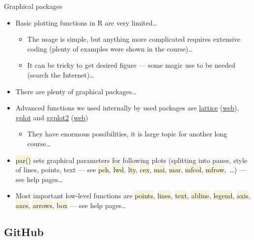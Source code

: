 \documentclass[compress, xelatex, 11pt, xcolor=svgnames, aspectratio=169,
	hyperref={
		bookmarks=true,
		unicode=true,
		colorlinks=true,
		pdftitle={Molecular data in R},
		plainpages=false,
		pdfauthor={Vojtech Zeisek},
		pdfsubject={Course about phylogeny and evolution in R},
		pdfcreator={XeLaTeX},
		pdfkeywords={R, evolution, phylogeny, molecular data},
		linkcolor=Crimson, %
		anchorcolor=Magenta, %
		citecolor=Magenta, %
		filecolor=Magenta, %
		menucolor=Magenta, %
		urlcolor=DodgerBlue, %
		},
	url={hyphens, lowtilde} %
	]{beamer}
\renewcommand{\texttt}[1]{\colorbox{Beige}{{\ttfamily #1}}}
\begin{document}
\begin{frame}{Graphical packages}
	\begin{itemize}
		\item Basic plotting functions in R are very limited\ldots
		\begin{itemize}
			\item The usage is simple, but anything more complicated requires extensive coding (plenty of examples were shown in the course)\ldots
			\item It can be tricky to get desired figure --- some magic use to be needed (search the Internet)\ldots
		\end{itemize}
		\item There are plenty of graphical packages\ldots
		\item Advanced functions we used internally by used packages are \href{https://CRAN.R-project.org/package=lattice}{lattice} (\href{https://lattice.r-forge.r-project.org/}{web}), \href{https://CRAN.R-project.org/package=gplots}{gplot} and \href{https://CRAN.R-project.org/package=ggplot2}{ggplot2} (\href{https://ggplot2.tidyverse.org/}{web})
		\begin{itemize}
			\item They have enormous possibilities, it is large topic for another long course\ldots
		\end{itemize}
		\item \texttt{par()} sets graphical parameters for following plots (splitting into panes, style of lines, points, text --- see \texttt{pch}, \texttt{lwd}, \texttt{lty}, \texttt{cex}, \texttt{mai}, \texttt{mar}, \texttt{mfcol}, \texttt{mfrow},~\ldots) --- see help pages\ldots
		\item Most important low-level functions are \texttt{points}, \texttt{lines}, \texttt{text}, \texttt{abline}, \texttt{legend}, \texttt{axis}, \texttt{axes}, \texttt{arrows}, \texttt{box} --- see help pages\ldots
	\end{itemize}
\end{frame}

\subsection{GitHub}
\end{document}
